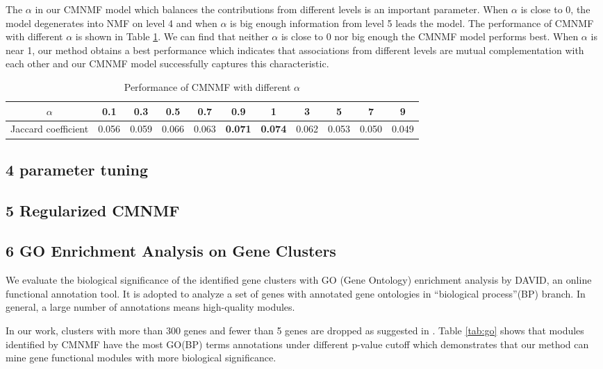 \documentclass{bmcart}
\begin{document}
The $\alpha$ in our CMNMF model which balances the contributions from different levels is an important parameter. When $\alpha$ is close to 0, the model degenerates into NMF on level 4 and when $\alpha$ is big enough information from level 5 leads the model. The performance of CMNMF with different $\alpha$ is shown in Table \ref{tab:alpha_tune}. We can find that neither $\alpha$ is close to 0 nor big enough the CMNMF model performs best. When $\alpha$ is near 1, our method obtains a best performance which indicates that associations from different levels are mutual complementation with each other and our CMNMF model successfully captures this characteristic.
\begin{table}
\centering
\caption{Performance of CMNMF with different $\alpha$}
\label{tab:alpha_tune}
\begin{tabular}{|c||c|c|c|c|c|c|c|c|c|c|}
\hline
 $\alpha$ &0.1& 0.3&0.5&0.7&0.9&1&3&5&7&9\\
\hline
Jaccard coefficient& 0.056 & 0.059 & 0.066 & 0.063 & \textbf{0.071}& \textbf{0.074} & 0.062 & 0.053 & 0.050 & 0.049\\
\hline
\end{tabular}
\end{table}

\subsection*{4 parameter tuning}

\subsection*{5 Regularized CMNMF}

\subsection*{6 GO Enrichment Analysis on Gene Clusters}

We evaluate the biological significance of the identified gene clusters with GO (Gene Ontology) enrichment analysis by DAVID\cite{David}, an online functional annotation tool. It is adopted to analyze a set of genes with annotated gene ontologies in ``biological process''(BP) branch. In general, a large number of annotations means high-quality modules.

In our work, clusters with more than 300 genes and fewer than 5 genes are dropped as suggested in \cite{SMNMF}. Table \ref{tab:go} shows that modules identified by CMNMF have the most GO(BP) terms annotations under different p-value cutoff which demonstrates that our method can mine gene functional modules with more biological significance.
\end{document}
